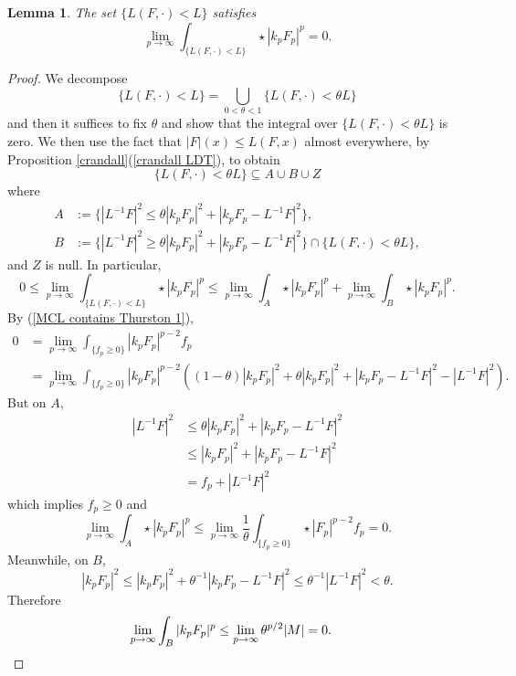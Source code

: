 \documentclass[reqno,11pt]{amsart}
\newtheorem{lemma}[theorem]{Lemma}
\theoremstyle{definition}
\numberwithin{equation}{section}
\begin{document}
\begin{lemma}\label{MCL contains Thurston lemma}
The set $\{L(F, \cdot) < L\}$ satisfies
$$\lim_{p \to \infty} \int_{\{L(F, \cdot) < L\}} \star |k_p F_p|^p = 0.$$
\end{lemma}
\begin{proof}
We decompose
$$\{L(F, \cdot) < L\} = \bigcup_{0 < \theta < 1} \{L(F, \cdot) < \theta L\}$$
and then it suffices to fix $\theta$ and show that the integral over $\{L(F, \cdot) < \theta L\}$ is zero.
We then use the fact that $|F|(x) \leq L(F, x)$ almost everywhere, by Proposition \ref{crandall}(\ref{crandall LDT}), to obtain
$$\{L(F, \cdot) < \theta L\} \subseteq A \cup B \cup Z$$
where 
\begin{align*}
A &:= \{|L^{-1} F|^2 \leq \theta |k_p F_p|^2 + |k_p F_p - L^{-1} F|^2\}, \\
B &:= \{|L^{-1} F|^2 \geq \theta |k_p F_p|^2 + |k_p F_p - L^{-1} F|^2\} \cap \{L(F, \cdot) < \theta L\},
\end{align*}
and $Z$ is null. 
In particular,
$$0 \leq \lim_{p \to \infty} \int_{\{L(F, \cdot) < L\}} \star |k_p F_p|^p \leq \lim_{p \to \infty} \int_A \star |k_p F_p|^p + \lim_{p \to \infty} \int_B \star |k_p F_p|^p.$$
By (\ref{MCL contains Thurston 1}),
\begin{align*}
0 &= \lim_{p \to \infty} \int_{\{f_p \geq 0\}} |k_p F_p|^{p - 2} f_p \\
&= \lim_{p \to \infty} \int_{\{f_p \geq 0\}} |k_p F_p|^{p - 2}((1 - \theta) |k_p F_p|^2 + \theta |k_p F_p|^2 + |k_p F_p - L^{-1} F|^2 - |L^{-1} F|^2).
\end{align*}
But on $A$,
\begin{align*}
|L^{-1} F|^2 &\leq \theta |k_p F_p|^2 + |k_p F_p - L^{-1} F|^2 \\
&\leq |k_p F_p|^2 + |k_p F_p - L^{-1} F|^2 \\
&= f_p + |L^{-1} F|^2
\end{align*}
which implies $f_p \geq 0$ and 
$$\lim_{p \to \infty} \int_A \star |k_p F_p|^p \leq \lim_{p \to \infty} \frac{1}{\theta} \int_{\{f_p \geq 0\}} \star |F_p|^{p - 2} f_p = 0.$$
Meanwhile, on $B$,
$$|k_p F_p|^2 \leq |k_p F_p|^2 + \theta^{-1} |k_p F_p - L^{-1} F|^2 \leq \theta^{-1} |L^{-1} F|^2 < \theta.$$
Therefore
\begin{align*}
	\lim_{p \to \infty} \int_B |k_p F_p|^p &\leq \lim_{p \to \infty} \theta^{p/2} |M| = 0. \qedhere
\end{align*}
\end{proof}
\end{document}
